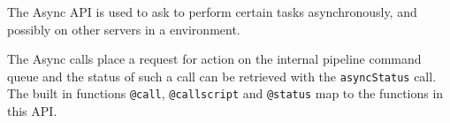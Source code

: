 The Async API is used to ask \Rapture to perform certain tasks asynchronously, and possibly on other servers in a \Rapture environment.

The Async calls place a request for action on the internal pipeline command queue and the status of such a call can be
retrieved with the \verb+asyncStatus+ call. The \Reflex built in functions \verb+@call+,
\verb+@callscript+ and \verb+@status+ map to the functions in this API.

